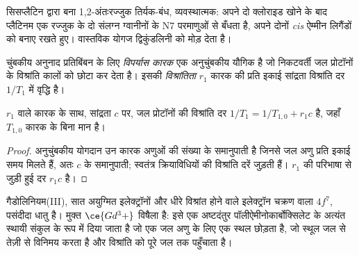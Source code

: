 \begin{omfigure}

{\small सिसप्लैटिन द्वारा बना 1,2-अंतःरज्जुक तिर्यक-बंध, व्यवस्थात्मक: अपने दो
क्लोराइड खोने के बाद प्लैटिनम एक रज्जुक के दो संलग्न ग्वानीनों के N7 परमाणुओं से
बँधता है, अपने दोनों \textit{cis} ऐम्मीन लिगैंडों को बनाए रखते हुए। वास्तविक योगज
द्विकुंडलिनी को मोड़ देता है।}
\end{omfigure}

\begin{definition}[विपर्यास कारक]\label{def:b3:bioinorganic:contrast}
चुंबकीय अनुनाद प्रतिबिंबन के लिए \emph{विपर्यास कारक}
एक अनुचुंबकीय यौगिक है जो निकटवर्ती जल प्रोटॉनों के विश्रांति कालों को छोटा कर देता है।
इसकी \emph{विश्रांतिता} $r_1$ कारक की प्रति इकाई सांद्रता
विश्रांति दर $1/T_1$ में वृद्धि है।
\end{definition}

\begin{proposition}[विश्रांति दर]\label{prop:b3:bioinorganic:relaxivity}
 $r_1$ वाले कारक के साथ, सांद्रता $c$ पर, जल
प्रोटॉनों की विश्रांति दर $1/T_1 = 1/T_{1,0} + r_1c$ है, जहाँ $T_{1,0}$ कारक के बिना मान है।
\end{proposition}

\begin{proof}
अनुचुंबकीय योगदान उन कारक अणुओं की संख्या के समानुपाती है जिनसे
जल अणु प्रति इकाई समय मिलते हैं, अतः $c$ के समानुपाती; स्वतंत्र क्रियाविधियों की
विश्रांति दरें जुड़ती हैं। $r_1$ की परिभाषा से जुड़ी हुई दर $r_1c$ है।
\end{proof}

गैडोलिनियम(III), सात अयुग्मित इलेक्ट्रॉनों और धीरे विश्रांत होने वाले इलेक्ट्रॉन चक्रण वाला
$4f^7$, पसंदीदा धातु है। मुक्त $\ce{Gd^3+}$ विषैला है: इसे एक अष्टदंतुर
पॉलीऐमीनोकार्बोक्सिलेट के अत्यंत स्थायी संकुल के रूप में दिया जाता है जो एक जल अणु के लिए एक
स्थल छोड़ता है, जो स्थूल जल से तेज़ी से विनिमय करता है और विश्रांति को
पूरे जल तक पहुँचाता है।

